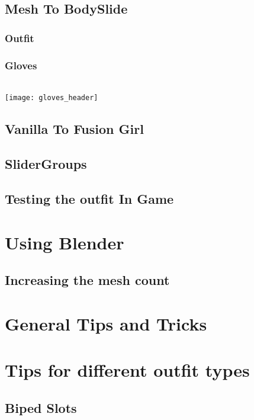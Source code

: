 \documentclass[12pt]{article}
\begin{document}
\subsection{Mesh To BodySlide}
\subsubsection{Outfit}

\pagebreak
\subsubsection{Gloves}
\\
\texttt{[image: gloves\_header]}
\pagebreak
\subsection{Vanilla To Fusion Girl}

\pagebreak
\subsection{SliderGroups}

\pagebreak
\subsection{Testing the outfit In Game}

\pagebreak
\section{Using Blender}
\subsection{Increasing the mesh count}

\pagebreak
\section{General Tips and Tricks}

\pagebreak
\section{Tips for different outfit types}
%
\subsection{Biped Slots}

\pagebreak
\end{document}
